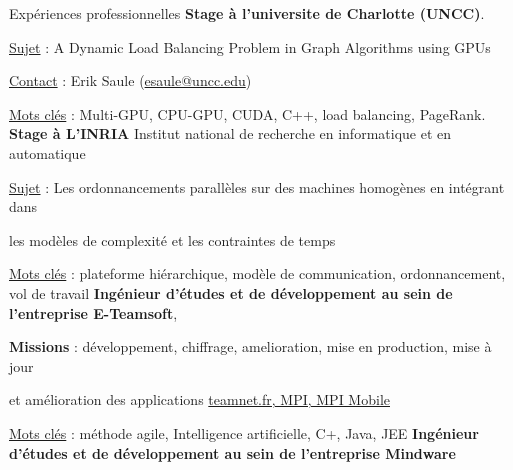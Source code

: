 \begin{rubric}{Expériences professionnelles}
%
\entry*[]
 \textbf{Stage à l’universite de Charlotte (UNCC)}.
     \hfill{} 
	\par \underline{Sujet} : A Dynamic Load Balancing Problem in Graph Algorithms using GPUs
	\hfill {}
    \par \underline{Contact} : Erik Saule (\href{mailto:esaule@uncc.edu}{esaule@uncc.edu})
    \hfill {}
	\par \underline{Mots clés} : Multi-GPU, CPU-GPU, CUDA, C++, load balancing, PageRank.
%
\entry*[]
    \textbf{Stage à L'INRIA} Institut national de recherche en informatique et en automatique
     \hfill{} 
	\par \underline{Sujet} : Les ordonnancements parallèles sur des machines homogènes en intégrant dans
	\hfill {}
    \par les modèles de complexité et les contraintes de temps
    \hfill {}
	\par \underline{Mots clés} : plateforme hiérarchique, modèle de communication, ordonnancement, vol de travail
%
%
\entry*[]
	\textbf{Ingénieur d'études et de développement au sein de l’entreprise E-Teamsoft}, 
     \hfill{} 
	\par \textbf{Missions} : développement, chiffrage, amelioration, mise en production,
                              mise à jour 
    \hfill {}
    \par et amélioration des applications \url{teamnet.fr, MPI, MPI Mobile} 
    \hfill {}
    \par \underline{Mots clés} : méthode agile, Intelligence artificielle, C+, Java, JEE
\entry*[]
	\textbf{Ingénieur d'études et de développement au sein de l’entreprise Mindware}

\end{rubric}
